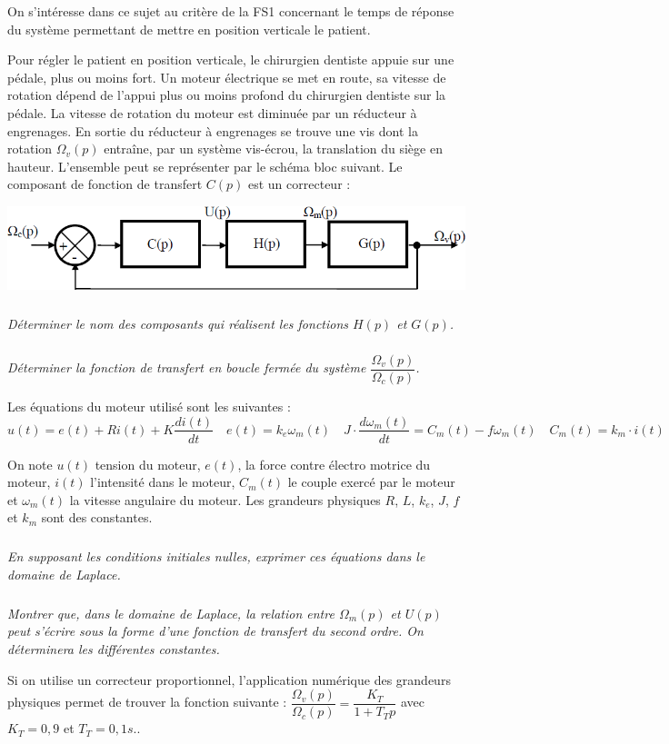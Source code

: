 \documentclass[11pt,oneside]{article}
\begin{document}
On s'intéresse dans ce sujet au critère de la FS1 concernant le temps de réponse du système permettant de mettre en position verticale le patient. 

Pour régler le patient en position verticale, le chirurgien dentiste appuie sur une pédale, plus ou moins fort. Un moteur électrique se met en route, sa vitesse de rotation dépend de l'appui plus ou moins profond du chirurgien dentiste sur la pédale. La vitesse de rotation du moteur est diminuée par un réducteur à engrenages. En sortie du réducteur à engrenages se trouve une vis dont la rotation $\Omega_v(p)$ entraîne, par un système vis-écrou, la translation du siège en hauteur. L'ensemble peut se représenter par le schéma bloc suivant. Le composant de fonction de transfert $C(p)$ est un correcteur :


\begin{center}
\includegraphics[width=.6\textwidth]{png/fig3}
\end{center}

\subparagraph{}
\textit{Déterminer le nom des composants qui réalisent les fonctions $H(p)$ et $G(p)$.}

\subparagraph{}
\textit{Déterminer la fonction de transfert en boucle fermée du système $\dfrac{\Omega_v(p)}{\Omega_c(p)}$.}

Les équations du moteur utilisé sont les suivantes :
$$
u(t)=e(t)+Ri(t)+K\dfrac{di(t)}{dt} \quad e(t) = k_e \omega_m(t) \quad J\cdot\dfrac{d\omega_m(t)}{dt} = C_m(t)-f\omega_m(t) \quad C_m(t)=k_m \cdot i(t)
$$

On note $u(t)$ tension du moteur, $e(t)$, la force contre électro motrice du moteur, $i(t)$ l'intensité dans le moteur, $C_m(t)$ le couple exercé par le moteur et $\omega_m(t)$ la vitesse angulaire du moteur. Les grandeurs physiques $R$, $L$, $k_e$, $J$, $f$ et $k_m$ sont des constantes.

\subparagraph{}
\textit{En supposant les conditions initiales nulles, exprimer ces équations dans le domaine de Laplace.}

\subparagraph{}
\textit{Montrer que, dans le domaine de Laplace, la relation entre $\Omega_m(p)$ et $U(p)$ peut s'écrire sous la forme d'une fonction de transfert du second ordre. On déterminera les différentes constantes.}

Si on utilise un correcteur proportionnel, l'application numérique des grandeurs physiques permet de trouver la fonction suivante : $\dfrac{\Omega_v(p)}{\Omega_c(p)} =\dfrac{K_T}{1+T_T p}$ avec $K_T=0,9$ et $T_T=0,1 s.$.
\end{document}
